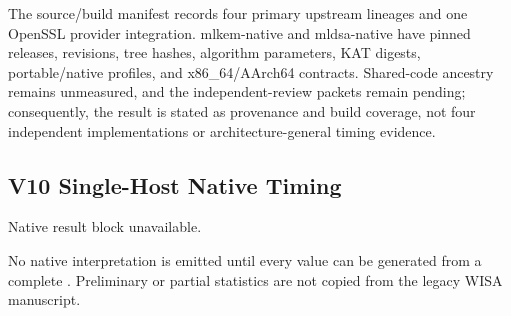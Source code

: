 \documentclass[cryptography,article,submit,moreauthors]{Definitions/mdpi}
\newif\ifNativeResultsAvailable
\newcommand{\NativeResultSummary}{Native result block unavailable.}
\newcommand{\evidence}[1]{\texttt{#1}}
\begin{document}
The source/build manifest records four primary upstream lineages and one
OpenSSL provider integration. mlkem-native and mldsa-native have pinned releases,
revisions, tree hashes, algorithm parameters, KAT digests, portable/native
profiles, and x86\_64/AArch64 contracts. Shared-code ancestry remains
unmeasured, and the independent-review packets remain pending; consequently,
the result is stated as provenance and build coverage, not four independent
implementations or architecture-general timing evidence.

\subsection{V10 Single-Host Native Timing}
\label{sec:native-results}

\NativeResultSummary{}



\ifNativeResultsAvailable
All 28 primary axes passed their frozen timing-validity gates. The three
\evidence{risk-detected} rows are the PQClean, mlkem-native portable, and
mlkem-native x86\_64 ML-KEM decapsulation \texttt{valid\_tuple} axes. Each
class changes a matching secret key, ciphertext, and the public material
embedded in the secret key together. These are therefore reproducible mixed
input timing signals on this host, not secret-key-only leakage attribution or
key-recovery evidence. The distinct PQClean ciphertext-only, FO-path, and
KyberSlash chosen-ciphertext axes remain \evidence{no-finding-observed} under
their own input contracts.

Exactly one of 17 preregistered pairwise comparisons is Holm-significant: the
mlkem-native portable versus x86\_64 \texttt{valid\_tuple} class-mean-delta
contrast ($p_{\mathrm{Holm}}=0.000288$). Both profiles retain a primary
\evidence{risk-detected} state, so this secondary result compares signal
magnitude and does not rank either profile as secure. None of the six Falcon,
six KyberSlash chosen-ciphertext, three KyberSlash operand, or one ML-DSA
pairwise comparisons is Holm-significant.

Three of 13 signature-length endpoints are variable-length PQClean Falcon
outputs. Their largest absolute within-class Pearson coefficient is below
$0.0024$; the remaining ten endpoints are fixed length. The length analysis
does not declassify the primary signature results.
\else
No native interpretation is emitted until every value can be generated from a
complete . Preliminary or partial statistics
are not copied from the legacy WISA manuscript.
\fi
\end{document}
